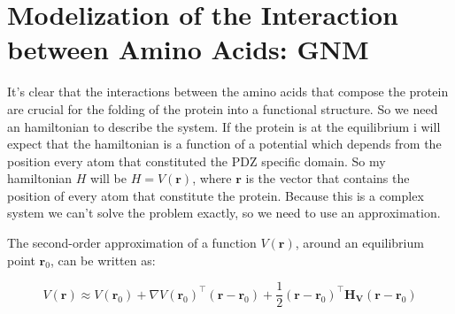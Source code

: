 \documentclass[English, Lau, oneside]{sapthesis}
\begin{document}
\chapter{Modelization of the Interaction between Amino Acids: GNM}
It's clear that the interactions between the amino acids that compose the protein are crucial for the folding of the protein into a functional structure.
So we need an hamiltonian to describe the system.
If the protein is at the equilibrium i will expect that the hamiltonian is a function of a potential which depends from the position every atom that constituted the PDZ specific domain.
So my hamiltonian $H$ will be \( H = V(\mathbf{r}) \), where \( \mathbf{r} \) is the vector that contains the position of every atom that constitute the protein.
Because this is a complex system we can't solve the problem exactly, so we need to use an approximation.

The second-order approximation of a function \( V(\mathbf{r}) \), around an equilibrium point \( \mathbf{r}_0 \), can be written as:

\begin{equation}
V(\mathbf{r}) \approx V(\mathbf{r}_0) + \nabla V(\mathbf{r}_0)^\top (\mathbf{r} - \mathbf{r}_0) + \frac{1}{2} (\mathbf{r} - \mathbf{r}_0)^\top \mathbf{H_V} (\mathbf{r} - \mathbf{r}_0)
\end{equation}
\end{document}
